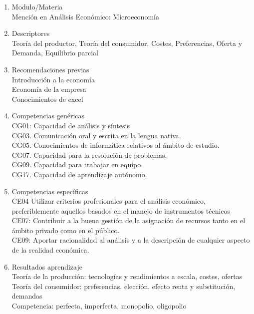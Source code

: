 \documentclass{article}\usepackage[]{graphicx}\usepackage[]{color}
\begin{document}
\begin{enumerate}
  \item Modulo/Materia\\
  Mención en Análisis Económico: Microeconomía

  \item Descriptores\\
        Teoría del productor, Teoría del consumidor, Costes, Preferencias, Oferta y Demanda, Equilibrio parcial

  \item Recomendaciones previas\\
        Introducción a la economía\\
        Economía de la empresa\\
        Conocimientos de excel

  \item Competencias genéricas\\
        CG01: Capacidad de análisis y síntesis\\
        CG03. Comunicación oral y escrita en la lengua nativa.\\
        CG05. Conocimientos de informática relativos al ámbito de estudio.\\
        CG07. Capacidad para la resolución de problemas.\\
        CG09. Capacidad para trabajar en equipo.\\
        CG17. Capacidad de aprendizaje autónomo.

  \item Competencias específicas\\
        CE04 Utilizar criterios profesionales para el análisis económico, preferiblemente aquellos basados en el manejo de instrumentos técnicos\\
        CE07: Contribuir a la buena gestión de la asignación de recursos tanto en el ámbito privado como en el público.\\
        CE09: Aportar racionalidad al análisis y a la descripción de cualquier aspecto de la realidad económica.

  \item Resultados aprendizaje\\
        Teoría de la producción: tecnologías y rendimientos a escala, costes, ofertas\\
        Teoría del consumidor: preferencias, elección, efecto renta y substitución, demandas\\
        Competencia: perfecta, imperfecta, monopolio, oligopolio


\end{enumerate}
\end{document}
